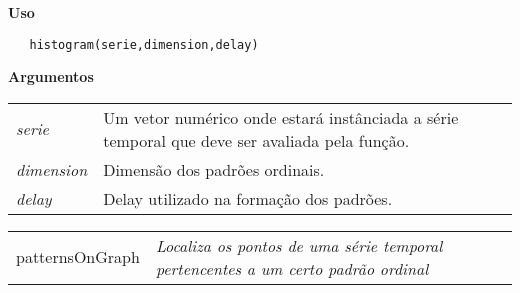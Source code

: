 \vspace{-0.5cm}

\hrulefill  

\vspace{0.5cm}

\textbf{Uso}

\begin{lstlisting}
   histogram(serie,dimension,delay)
\end{lstlisting}

\vspace{0.5cm}

\textbf{Argumentos}

\begin{table}[!ht]
\begin{center}
\begin{tabularx}{\textwidth}{X X}
\hspace{0.5cm} \textit{serie} \vspace{0.5cm}& Um vetor numérico onde estará instânciada a série temporal que deve ser avaliada pela função.\vspace{0.5cm}\\
\hspace{0.5cm} \textit{dimension} \vspace{0.5cm}& Dimensão dos padrões ordinais.\vspace{0.5cm}\\
\hspace{0.5cm} \textit{delay} \vspace{0.5cm}& Delay utilizado na formação dos padrões.\vspace{0.5cm}\\
\end{tabularx}
\end{center}
\end{table} 

\newpage

\hrulefill   

\begin{table}[!ht]
\begin{center}
\begin{tabularx}{\textwidth}{ X X}
\hspace{0.5cm} patternsOnGraph & \textit{Localiza os pontos de uma série temporal pertencentes a um certo padrão ordinal}
\end{tabularx}
\end{center}
\end{table} 

